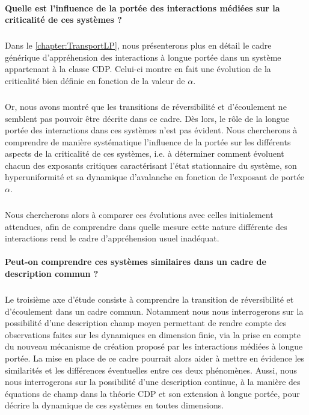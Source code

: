 \paragraph{Quelle est l'influence de la portée des interactions médiées sur la criticalité de ces systèmes ?}

\subparagraph{}Dans le \autoref{chapter:TransportLP}, nous présenterons plus en détail le cadre générique d'appréhension des interactions à longue portée dans un système appartenant à la classe CDP. Celui-ci montre en fait une évolution de la criticalité bien définie en fonction de la valeur de $\alpha$.

\subparagraph{}Or, nous avons montré que les transitions de réversibilité et d'écoulement ne semblent pas pouvoir être décrite dans ce cadre. Dès lors, le rôle de la longue portée des interactions dans ces systèmes n'est pas évident. Nous chercherons à comprendre de manière systématique l'influence de la portée sur les différents aspects de la criticalité de ces systèmes, i.e. à déterminer comment évoluent chacun des exposants critiques caractérisant l'état stationnaire du système, son hyperuniformité et sa dynamique d'avalanche en fonction de l'exposant de portée $\alpha$.

\subparagraph{}Nous chercherons alors à comparer ces évolutions avec celles initialement attendues, afin de comprendre dans quelle mesure cette nature différente des interactions rend le cadre d'appréhension usuel inadéquat.

\paragraph{Peut-on comprendre ces systèmes similaires dans un cadre de description commun ?}

\subparagraph{}Le troisième axe d'étude consiste à comprendre la transition de réversibilité et d'écoulement dans un cadre commun. Notamment nous nous interrogerons sur la possibilité d'une description champ moyen permettant de rendre compte des observations faites sur les dynamiques en dimension finie, via la prise en compte du nouveau mécanisme de création proposé par les interactions médiées à longue portée. La mise en place de ce cadre pourrait alors aider à mettre en évidence les similarités et les différences éventuelles entre ces deux phénomènes. Aussi, nous nous interrogerons sur la possibilité d'une description continue, à la manière des équations de champ dans la théorie CDP et son extension à longue portée, pour décrire la dynamique de ces systèmes en toutes dimensions.

